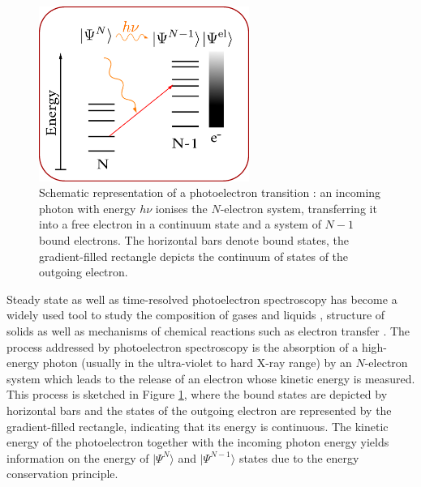 \begin{figure}
   \includegraphics[width=0.61\textwidth]{Figures/PESscheme.eps}
   \caption{Schematic representation of a photoelectron transition : an incoming photon with energy $h\nu$ ionises the $N$-electron system, transferring it into a free electron in a continuum state and a system of $N-1$ bound electrons.
   The horizontal bars denote bound states, the gradient-filled rectangle depicts the continuum of states of the outgoing electron.}
   \label{fig:PESscheme}
\end{figure}
Steady state as well as time-resolved photoelectron spec\-tros\-co\-py has become a widely used tool to study the composition of gases and liquids \cite{winterWater,liquid1,XrayDynamics,hafied}, structure of solids \cite{solid1} as well as mechanisms of chemical reactions such as electron transfer \cite{XrayDynamics}.
The process addressed by photoelectron spec\-tros\-co\-py is the absorption of a high-energy photon (usually in the ultra-violet to hard X-ray range) by an $N$-electron system which leads to the release of an electron whose kinetic energy is measured.
This process is sketched in Figure \ref{fig:PESscheme}, where the bound states are depicted by horizontal bars and the states of the outgoing electron are represented by the gradient-filled rectangle, indicating that its energy is continuous.
The kinetic energy of the photoelectron together with the incoming photon energy yields information on the energy of $|\Psi^N \rangle$ and $|\Psi^{N-1} \rangle$ states due to the energy conservation principle.

